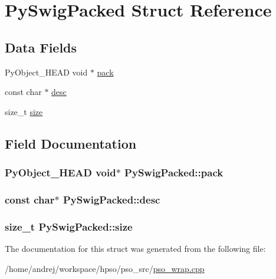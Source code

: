 \hypertarget{structPySwigPacked}{
\section{PySwigPacked Struct Reference}
\label{structPySwigPacked}
}
\subsection*{Data Fields}
\begin{CompactItemize}
\item 
PyObject\_\-HEAD void $\ast$ \hyperlink{structPySwigPacked_7fac680e3a96606a34843580fa5e4f41}{pack}
\item 
const char $\ast$ \hyperlink{structPySwigPacked_ac67aa8c7967392a57e2842351ad4b3a}{desc}
\item 
size\_\-t \hyperlink{structPySwigPacked_6aa05cd77dd6575d5ab6b3039b431946}{size}
\end{CompactItemize}


\subsection{Field Documentation}
\hypertarget{structPySwigPacked_7fac680e3a96606a34843580fa5e4f41}{
\subsubsection{\setlength{\rightskip}{0pt plus 5cm}PyObject\_\-HEAD void$\ast$ {\bf PySwigPacked::pack}}}
\label{structPySwigPacked_7fac680e3a96606a34843580fa5e4f41}


\hypertarget{structPySwigPacked_ac67aa8c7967392a57e2842351ad4b3a}{
\subsubsection{\setlength{\rightskip}{0pt plus 5cm}const char$\ast$ {\bf PySwigPacked::desc}}}
\label{structPySwigPacked_ac67aa8c7967392a57e2842351ad4b3a}


\hypertarget{structPySwigPacked_6aa05cd77dd6575d5ab6b3039b431946}{
\subsubsection{\setlength{\rightskip}{0pt plus 5cm}size\_\-t {\bf PySwigPacked::size}}}
\label{structPySwigPacked_6aa05cd77dd6575d5ab6b3039b431946}




The documentation for this struct was generated from the following file:\begin{CompactItemize}
\item 
/home/andrej/workspace/hpso/pso\_\-src/\hyperlink{pso__wrap_8cpp}{pso\_\-wrap.cpp}\end{CompactItemize}
